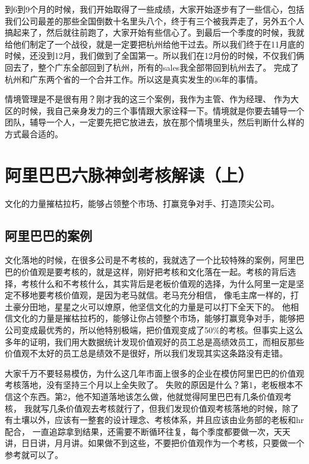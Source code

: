 \documentclass[12pt]{article}
\begin{document}
到6到9个月的时候，我们开始取得了一些成绩，大家开始逐步有了一些信心，包括我们公司最差的那些全国倒数十名里头八个，终于有三个被我弄走了，另外五个人搞起来了，然后就往前跑了，大家开始有些信心了。到最后一个季度的时候，我就给他们制定了一个战役，就是一定要把杭州给他干过去。所以我们终于在11月底的时候，还没到12月，我们做到了全国第一。所以我们在12月份的时候，不仅我们俩回去了，整个广东全部回到了杭州，所有的sales我全部带回到杭州去了。 完成了杭州和广东两个省的一个合并工作。所以这是真实发生的06年的事情。

\begin{framed}
情境管理是不是很有用？刚才我的这三个案例，我作为主管、作为经理、 作为大区的时候，我自己亲身发力的三个事情跟大家诠释一下。情境就是你要去辅导一个团队，辅导一个人，一定要先把它放进去，放在那个情境里头，然后判断什么样的方式最合适的。
\end{framed}

\section{阿里巴巴六脉神剑考核解读（上）}
\begin{framed}
文化的力量摧枯拉朽，能够占领整个市场、打赢竞争对手、打造顶尖公司。
\end{framed}

\subsection{阿里巴巴的案例}
文化落地的时候，在很多公司是不考核的，我就选了一个比较特殊的案例，阿里巴巴的价值观是要考核的，就是这样，刚好把考核和文化落在一起。考核的背后选择，考核什么和不考核什么，其实背后是老板价值观的选择，为什么阿里一定是坚定不移地要考核价值观，是因为老马就信。老马充分相信， 像毛主席一样的，打土豪分田地，星星之火可以燎原，他坚信文化的力量是可以打下全天下的。 他相信文化的力量是摧枯拉朽的，能够让你占领整个市场，能够打赢竞争对手，能够把公司变成最优秀的，所以他特别极端，把价值观变成了50\%的考核。但事实上这么多年的证明，我们用大数据统计发现价值观好的员工总是高绩效员工，而相反那些价值观不太好的员工总是绩效不是很好，所以我们发现其实这条路没有走错。

大家千万不要轻易模仿，为什么这几年市面上很多的企业在模仿阿里巴巴的价值观考核落地，没有坚持三个月以上全失败了。 失败的原因是什么？第1，老板根本不信这个东西。第2，他不知道落地该怎么做，他就觉得阿里巴巴有几条价值观考核， 我就写几条价值观去考核就行了，但我们发现价值观考核落地的时候，除了有土壤以外，应该有一整套的设计理念、考核体系，并且应该由业务部的老板和hr配合， 一直追踪拿到结果，还需要不断循环往复，每个季度都要做一次，天天讲，日日讲，月月讲。如果做不到这些，不要把价值观作为一个考核，只要做一个参考就可以了。
\end{document}
